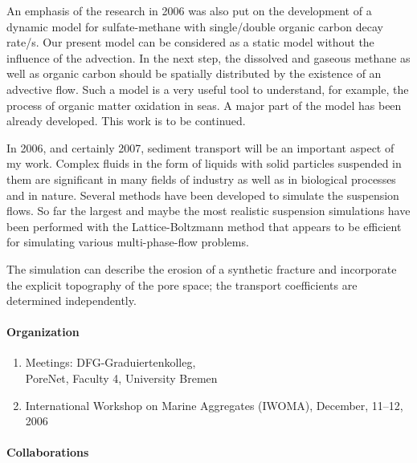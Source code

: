 An emphasis of the research in 2006 was also put on the development of a
dynamic model for sulfate-methane with single/double
organic carbon decay rate/s.
Our present model can be considered as a static model without
the influence of the advection. In the next step, the dissolved
and gaseous methane as well as organic carbon should be
spatially distributed by the existence of an advective flow.
Such a model is a very useful tool to understand, for example, the
process of organic matter oxidation in seas. A major part of the model
has been already developed.
This work is to be continued.

In 2006, and certainly 2007, sediment transport will be an
important aspect of my work.
Complex fluids in the form of liquids with solid particles suspended in
them are significant in many fields of industry as well as in
biological processes and in nature.
Several methods have been developed to simulate the suspension
flows. So far the largest and maybe the most realistic
suspension simulations have been performed with the
Lattice-Boltzmann method that appears to be efficient
for simulating various multi-phase-flow problems.

The simulation can describe the erosion of a synthetic fracture and incorporate the explicit topography of the pore space; the transport coefficients are determined independently.



\paragraph{Organization}


\begin{enumerate}
\item  Meetings: DFG-Graduiertenkolleg, \\ PoreNet, Faculty 4,
    University Bremen
\item  International Workshop on Marine Aggregates (IWOMA),
       December, 11--12, 2006
\end{enumerate}


\paragraph{Collaborations}

